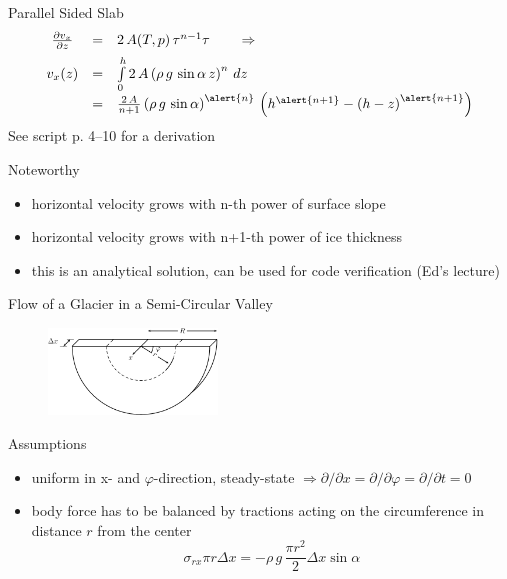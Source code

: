 \documentclass[hide notes,intlimits,unknownkeysallowed]{beamer}
\begin{document}
\begin{frame}{Parallel Sided Slab}
\begin{equation*}
    \begin{array}{ccl}
      \frac{\partial v_x}{\partial z}  & = &  2\,A(T,p)\,\tau^{n-1}\tau \qquad \Rightarrow \\[.5em]
      v_x (z) &  = & \int \limits_{0}^{h} 2\,A\left(\rho\,g\,\sin{\alpha}\,z\right)^{n}\,dz \\[.5em]
& = &\frac{2\,A}{n+1} \left(\rho\,g\,\sin{\alpha}\right)^{\alert{n}}\,\left(h^{\alert{n+1}} - \left(h-z\right)^{\alert{n+1}}\right)
    \end{array}
  \end{equation*}
See script p. 4--10 for a derivation
\begin{block}{Noteworthy}
\begin{itemize}
\item horizontal velocity grows with \alert{n}-th power of surface slope
\item horizontal velocity grows with \alert{n+1}-th power of ice thickness
\item this is an analytical solution, can be used for code verification (Ed's lecture)
\end{itemize}
\end{block}
\end{frame}

\begin{frame}{Flow of a Glacier in a Semi-Circular Valley}
  \vspace{-1em}
  \begin{figure}
    \centering
    \includegraphics[width=0.4\textwidth]{fig_channel}
    \label{fig:valley-glacier-coord}
  \end{figure}
  \begin{block}{Assumptions}
    \begin{itemize}
    \item uniform in x- and $\varphi$-direction, steady-state $\Rightarrow \partial / \partial x = \partial / \partial \varphi = \partial / \partial t = 0$
    \item body force has to be balanced by tractions acting on the circumference in distance $r$ from the center
      \begin{equation*}
        \sigma_{rx} \pi r \Delta x = - \rho\,g\,\frac{\pi r^2}{2} \Delta x \sin \alpha
      \end{equation*}
\end{itemize}
  \end{block}
\end{frame}
\end{document}
